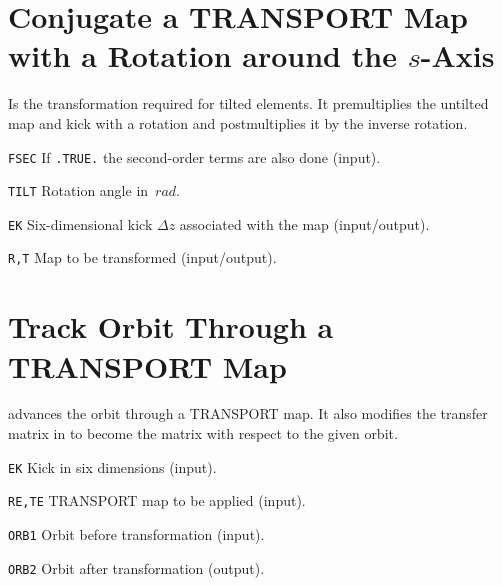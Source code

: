 \section{Conjugate a TRANSPORT Map with a Rotation around the $s$-Axis}
\label{TMTILT}
Is the transformation required for tilted elements.
It premultiplies the untilted map and kick with a rotation
and postmultiplies it by the inverse rotation.
\begin{mylist}
\item[\tt FSEC]
If {\tt .TRUE.} the second-order terms are also done (input).
\item[\tt TILT]
Rotation angle in~$rad$.
\item[\tt EK]
Six-dimensional kick $\Delta z$ associated with the map (input/output).
\item[\tt R,T]
Map to be transformed (input/output).
\end{mylist}

\section{Track Orbit Through a TRANSPORT Map}
\label{TMTRAK}
advances the orbit through a TRANSPORT map.
It also modifies the transfer matrix in  to
become the matrix with respect to the given orbit.
\begin{mylist}
\item[\tt EK]
Kick in six dimensions (input).
\item[\tt RE,TE]
TRANSPORT map to be applied (input).
\item[\tt ORB1]
Orbit before transformation (input).
\item[\tt ORB2]
Orbit after transformation (output).
\end{mylist}


